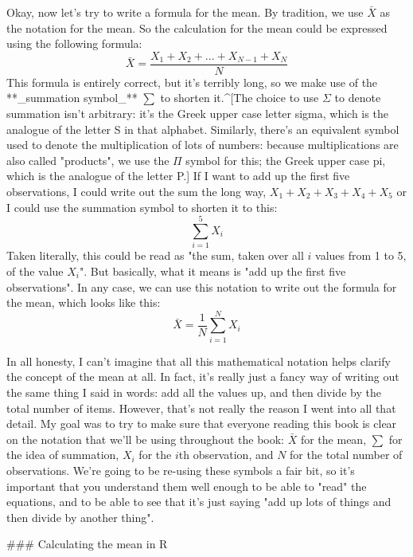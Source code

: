 Okay, now let's try to write a formula for the mean. By tradition, we use $\bar{X}$ as the notation for the mean. So the calculation for the mean could be expressed using the following formula:
$$
\bar{X} = \frac{X_1 + X_2 + ... + X_{N-1} + X_N}{N}
$$
This formula is entirely correct, but it's terribly long, so we make use of the **_summation symbol_** $\scriptstyle\sum$ to shorten it.^[The choice to use $\Sigma$ to denote summation isn't arbitrary: it's the Greek upper case letter sigma, which is the analogue of the letter S in that alphabet. Similarly, there's an equivalent symbol used to denote the multiplication of lots of numbers: because multiplications are also called "products", we use the $\Pi$ symbol for this; the Greek upper case pi, which is the analogue of the letter P.] If I want to add up the first five observations, I could write out the sum the long way, $X_1 + X_2 + X_3 + X_4 +X_5$ or I could use the summation symbol to shorten it to this:
$$
\sum_{i=1}^5 X_i
$$
Taken literally, this could be read as "the sum, taken over all $i$ values from 1 to 5, of the value $X_i$". But basically, what it means is "add up the first five observations". In any case, we can use this notation to write out the formula for the mean, which looks like this:
$$
\bar{X} = \frac{1}{N} \sum_{i=1}^N X_i 
$$

In all honesty, I can't imagine that all this mathematical notation helps clarify the concept of the mean at all. In fact, it's really just a fancy way of writing out the same thing I said in words: add all the values up, and then divide by the total number of items. However, that's not really the reason I went into all that detail. My goal was to try to make sure that everyone reading this book is clear on the notation that we'll be using throughout the book: $\bar{X}$ for the mean, $\scriptstyle\sum$ for the idea of summation, $X_i$ for the $i$th observation, and $N$ for the total number of observations. We're going to be re-using these symbols a fair bit, so it's important that you understand them well enough to be able to "read" the equations, and to be able to see that it's just saying "add up lots of things and then divide by another thing".

### Calculating the mean in R


